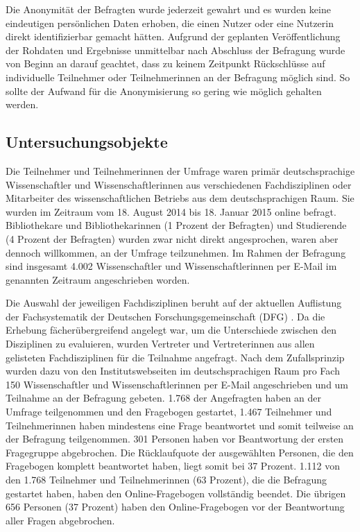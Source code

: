 Die Anonymität der Befragten wurde jederzeit gewahrt und es wurden keine eindeutigen persönlichen Daten erhoben, die einen Nutzer oder eine Nutzerin direkt identifizierbar gemacht hätten. Aufgrund der geplanten Veröffentlichung der Rohdaten und Ergebnisse unmittelbar nach Abschluss der Befragung wurde von Beginn an darauf geachtet, dass zu keinem Zeitpunkt Rückschlüsse auf individuelle Teilnehmer oder Teilnehmerinnen an der Befragung möglich sind. So sollte der Aufwand für die Anonymisierung so gering wie möglich gehalten werden.

\subsection{Untersuchungsobjekte}

Die Teilnehmer und Teilnehmerinnen der Umfrage waren primär deutschsprachige Wissenschaftler und Wissenschaftlerinnen aus verschiedenen Fachdisziplinen oder Mitarbeiter des wissenschaftlichen Betriebs aus dem deutschsprachigen Raum. Sie wurden im Zeitraum vom 18. August 2014 bis 18. Januar 2015 online befragt. Bibliothekare und Bibliothekarinnen (1 Prozent der Befragten) und Studierende (4 Prozent der Befragten) wurden zwar nicht direkt angesprochen, waren aber dennoch willkommen, an der Umfrage teilzunehmen. Im Rahmen der Befragung sind insgesamt 4.002 Wissenschaftler und Wissenschaftlerinnen per E-Mail im genannten Zeitraum angeschrieben worden.

Die Auswahl der jeweiligen Fachdisziplinen beruht auf der aktuellen Auflistung der Fachsystematik der Deutschen Forschungsgemeinschaft (DFG) \cite{DFG_2014b}. Da die Erhebung fächerübergreifend angelegt war, um die Unterschiede zwischen den Disziplinen zu evaluieren, wurden Vertreter und Vertreterinnen aus allen gelisteten Fachdisziplinen für die Teilnahme angefragt. Nach dem Zufallsprinzip wurden dazu von den Institutswebseiten im deutschsprachigen Raum pro Fach 150 Wissenschaftler und Wissenschaftlerinnen per E-Mail angeschrieben und um Teilnahme an der Befragung gebeten. 1.768 der Angefragten haben an der Umfrage teilgenommen und den Fragebogen gestartet, 1.467 Teilnehmer und Teilnehmerinnen haben mindestens eine Frage beantwortet und somit teilweise an der Befragung teilgenommen. 301 Personen haben vor Beantwortung der ersten Fragegruppe abgebrochen. Die Rücklaufquote der ausgewählten Personen, die den Fragebogen komplett beantwortet haben, liegt somit bei 37 Prozent. 1.112 von den 1.768 Teilnehmer und Teilnehmerinnen (63 Prozent), die die Befragung gestartet haben, haben den Online-Fragebogen vollständig beendet. Die übrigen 656 Personen (37 Prozent) haben den Online-Fragebogen vor der Beantwortung aller Fragen abgebrochen.

